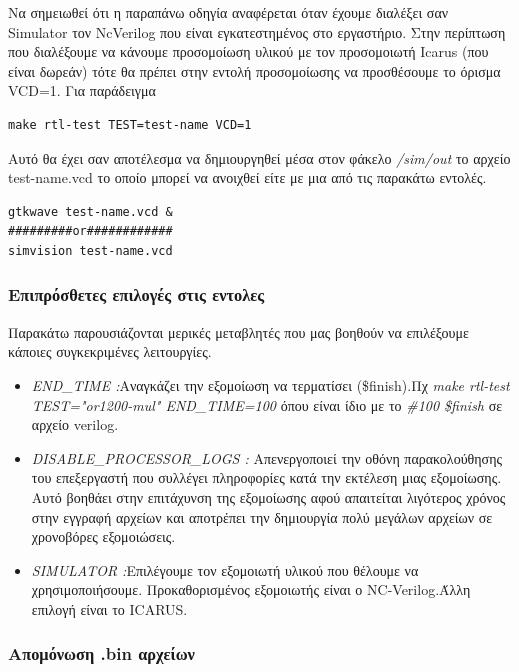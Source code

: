 \documentclass[a4paper,10pt]{article}
\numberwithin{figure}{section}
\numberwithin{table}{section}
\begin{document}
Να σημειωθεί ότι η παραπάνω οδηγία αναφέρεται όταν έχουμε διαλέξει σαν Simulator τον NcVerilog που είναι εγκατεστημένος στο εργαστήριο. Στην περίπτωση που διαλέξουμε να κάνουμε προσομοίωση υλικού με τον προσομοιωτή Icarus (που είναι δωρεάν) τότε θα πρέπει στην εντολή προσομοίωσης να προσθέσουμε το όρισμα VCD=1. Για παράδειγμα
\vspace{0.7cm}
\begin{lstlisting}
make rtl-test TEST=test-name VCD=1
\end{lstlisting}
\vspace{0.7cm}
 Αυτό θα έχει σαν αποτέλεσμα να δημιουργηθεί μέσα στον φάκελο \emph{/sim/out} το αρχείο test-name.vcd το οποίο μπορεί να ανοιχθεί είτε με μια από τις παρακάτω εντολές. 
\vspace{0.7cm}
\begin{lstlisting}
gtkwave test-name.vcd &
#########or############
simvision test-name.vcd
\end{lstlisting}
\vspace{0.7cm}


\subsubsection{ Eπιπρόσθετες επιλογές στις εντολες}


Παρακάτω παρουσιάζονται μερικές μεταβλητές που μας βοηθούν να επιλέξουμε κάποιες
συγκεκριμένες λειτουργίες.
\begin{itemize}
 \item \emph{END\_TIME    :}Αναγκάζει την εξομοίωση να τερματίσει (\$finish).Πχ 
\emph{make rtl-test TEST="or1200-mul" END\_TIME=100} όπου είναι ίδιο με το \emph{\#100 \$finish} σε αρχείο verilog.
\item \emph{DISABLE\_PROCESSOR\_LOGS    :} Απενεργοποιεί την οθόνη παρακολούθησης του επεξεργαστή
που συλλέγει πληροφορίες κατά την εκτέλεση μιας εξομοίωσης. Αυτό βοηθάει στην επιτάχυνση της εξομοίωσης αφού απαιτείται λιγότερος χρόνος στην
εγγραφή αρχείων και αποτρέπει την δημιουργία πολύ μεγάλων αρχείων σε χρονοβόρες εξομοιώσεις.
\item \emph{SIMULATOR    :}Επιλέγουμε τον εξομοιωτή υλικού που θέλουμε να χρησιμοποιήσουμε.
Προκαθορισμένος εξομοιωτής είναι ο NC-Verilog.Άλλη επιλογή είναι το ICARUS.
\end{itemize}


\subsubsection{ Απομόνωση .bin αρχείων}
\end{document}
